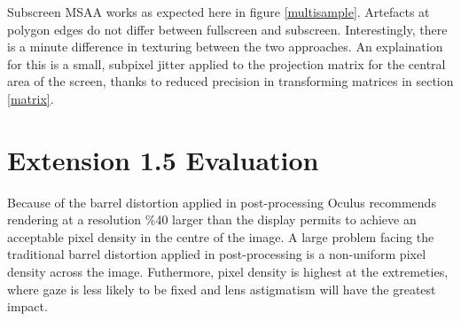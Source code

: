 \documentclass[12pt,a4paper,twoside,openright]{report}
\begin{document}
Subscreen MSAA works as expected here in figure \ref{multisample}. Artefacts at polygon edges do not differ between fullscreen and subscreen. Interestingly, there is a minute difference in texturing between the two approaches. An explaination for this is a small, subpixel jitter applied to the projection matrix for the central area of the screen, thanks to reduced precision in transforming matrices in section \ref{matrix}.

\clearpage

\section{Extension 1.5 Evaluation}

Because of the barrel distortion applied in post-processing Oculus recommends rendering at a resolution \%40 larger than the display permits to achieve an acceptable pixel density in the centre of the image.
A large problem facing the traditional barrel distortion applied in post-processing is a non-uniform pixel density across the image. Futhermore, pixel density is highest at the extremeties, where gaze is less likely to be fixed and lens astigmatism will have the greatest impact. 
\end{document}
